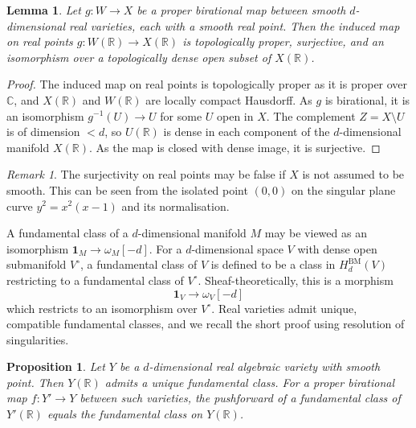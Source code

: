\documentclass{amsart}
\newtheorem{lem}[thm]{Lemma}
\newtheorem{prop}[thm]{Proposition}
\theoremstyle{definition}
\theoremstyle{remark}
\newtheorem{remark}[thm]{Remark}
\begin{document}
\begin{lem}
Let $g:W\to X$ be a proper birational map between smooth $d$-dimensional real varieties, each with a smooth real point. Then the induced map on real points $g:W(\mathbb{R})\to X(\mathbb{R})$ is topologically proper, surjective, and an isomorphism over a topologically dense open subset of $X(\mathbb{R})$.
\end{lem}

\begin{proof}
The induced map on real points is topologically proper as it is proper over $\mathbb{C}$, and $X(\mathbb{R})$ and $W(\mathbb{R})$ are locally compact Hausdorff. As $g$ is birational, it is an isomorphism $g^{-1}(U)\to U$ for some $U$ open in $X$. The complement $Z=X\setminus U$ is of dimension $<d$, so $U(\mathbb{R})$ is dense in each component of the $d$-dimensional manifold $X(\mathbb{R})$. As the map is closed with dense image, it is surjective.
\end{proof}
\begin{remark}
    The surjectivity on real points may be false if $X$ is not assumed to be smooth. This can be seen from the isolated point $(0,0)$ on the singular plane curve $y^2=x^2(x-1)$ and its normalisation.
\end{remark}

A fundamental class of a $d$-dimensional manifold $M$ may be viewed as an isomorphism $\mathbf{1}_M\to \omega_M[-d]$. For a $d$-dimensional space $V$ with dense open submanifold $V^\circ$, a fundamental class of $V$ is defined to be a class in $H_d^{\mathrm{BM}}(V)$ restricting to a fundamental class of $V^\circ$. Sheaf-theoretically, this is a morphism \[\mathbf{1}_V\to \omega_V[-d]\] which restricts to an isomorphism over $V^\circ$. Real varieties admit unique, compatible fundamental classes, and we recall the short proof using resolution of singularities.

\begin{prop}
Let $Y$ be a $d$-dimensional real algebraic variety with smooth point. Then $Y(\mathbb{R})$ admits a unique fundamental class. For a proper birational map $f:Y'\to Y$ between such varieties, the pushforward of a fundamental class of $Y'(\mathbb{R})$ equals the fundamental class on $Y(\mathbb{R})$.
\end{prop}
\end{document}
